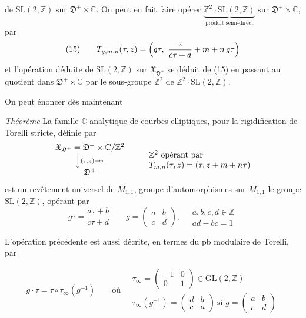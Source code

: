 \documentclass[11pt,a4paper]{article}
\begin{document}
de $\mathrm{SL}(2,\mathbb{Z})$ sur $\mathfrak{D}^+ \times \mathbb{C}$. On peut en
fait faire opérer $\underbrace{\mathbb{Z}^2 \cdot \mathrm{SL}(2,\mathbb{Z})}_{\text{produit semi-direct}}$
\struck{\ill{}} sur $\mathfrak{D}^+ \times \mathbb{C}$, par
\[
(15)\qquad T_{g,m,n}(\tau, z) = \Bigl(g\tau,\ \frac{z}{c\tau + d} + m + n\, g\tau\Bigr)
\]
et l'opération déduite de $\mathrm{SL}(2,\mathbb{Z})$ sur
$\mathfrak{X}_{\mathfrak{D}^+}$ se déduit de (15) en passant au quotient
\struck{\ill{}} dans $\mathfrak{D}^+ \times \mathbb{C}$ par le 
sous-groupe $\mathbb{Z}^2$ de $\mathbb{Z}^2 \cdot \mathrm{SL}(2,\mathbb{Z})$.

On peut énoncer dès maintenant

\emph{Théorème} La famille $\mathbb{C}$-analytique de courbes elliptiques,
  pour la rigidification de Torelli stricte, définie
par
\[
\begin{array}{c}
\mathfrak{X}_{\mathfrak{D}^+} = \mathfrak{D}^+ \times \mathbb{C} / \mathbb{Z}^2 \\
\Big\downarrow \scriptstyle (\tau, z) \mapsto \tau \\
\mathfrak{D}^+
\end{array}
\qquad
\begin{array}{l}
\mathbb{Z}^2 \text{ opérant par} \\
T_{m,n}(\tau, z) = (\tau, z + m + n\tau)
\end{array}
\]
est un revêtement universel de $M_{1,1}$,   groupe d'automorphismes sur
$M_{1,1}$ le groupe $\mathrm{SL}(2,\mathbb{Z})$, opérant par
\[
g\tau = \frac{a\tau + b}{c\tau + d} \qquad
g = \begin{pmatrix} a & b \\ c & d \end{pmatrix},\quad
\begin{array}{l} a,b,c,d \in \mathbb{Z} \\ ad - bc = 1 \end{array}
\]

L'opération précédente est aussi décrite, en termes du pb modulaire de Torelli, par


\[
g \cdot \tau = \tau \circ \tau_\infty(g^{-1})
\qquad \text{où}\quad
\begin{array}{l}
\tau_\infty = \begin{pmatrix} -1 & 0 \\ 0 & 1 \end{pmatrix} \in \mathrm{GL}(2,\mathbb{Z}) \\[4pt]
\tau_\infty(g^{-1}) = \begin{pmatrix} d & b \\ c & a \end{pmatrix}
\ \text{si } g = \begin{pmatrix} a & b \\ c & d \end{pmatrix}
\end{array}
\]
\end{document}
